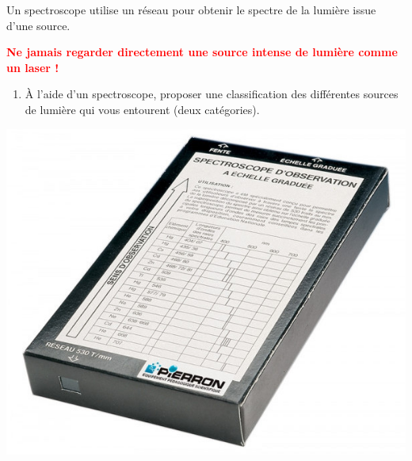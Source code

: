 \documentclass[12pt,a4paper,fleqn]{article}
\begin{document}
\begin{multicols}{2}
Un spectroscope utilise un réseau pour obtenir le spectre de la lumière issue d'une source.

\noindent
\textcolor{red}{\textbf{\warning{} Ne jamais regarder directement une source intense de lumière comme un laser !}}

\begin{enumerate}
\item \app{} \anarai{}

À l'aide d'un spectroscope, proposer une classification des différentes sources de lumière qui vous entourent (deux catégories).
\end{enumerate}

\begin{center}
\includegraphics[width=.5\linewidth]{images/spectroscope.jpg}
\end{center}
\end{multicols}
\end{document}
